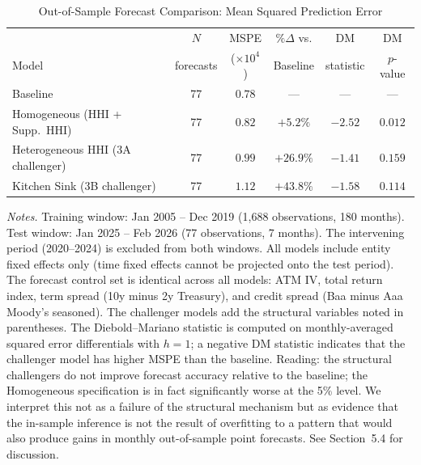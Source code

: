 
\begin{table}[!htbp]
\centering
\small
\caption{Out-of-Sample Forecast Comparison: Mean Squared Prediction Error}
\label{tab:oos_results}

\begin{threeparttable}
\begin{tabular}{l c c c c c}
\toprule
 & \multicolumn{1}{c}{$N$} & \multicolumn{1}{c}{MSPE}
   & \multicolumn{1}{c}{$\%\Delta$ vs.}
   & \multicolumn{1}{c}{DM}
   & \multicolumn{1}{c}{DM} \\
Model
   & \multicolumn{1}{c}{forecasts}
   & \multicolumn{1}{c}{($\times 10^{4}$)}
   & \multicolumn{1}{c}{Baseline}
   & \multicolumn{1}{c}{statistic}
   & \multicolumn{1}{c}{$p$-value} \\
\midrule
Baseline                            & 77 & $0.78$ & ---       & ---     & ---     \\
\addlinespace[2pt]
Homogeneous (HHI + Supp.\ HHI)      & 77 & $0.82$ & $+5.2\%$  & $-2.52$ & $0.012$ \\
Heterogeneous HHI (3A challenger)   & 77 & $0.99$ & $+26.9\%$ & $-1.41$ & $0.159$ \\
Kitchen Sink (3B challenger)        & 77 & $1.12$ & $+43.8\%$ & $-1.58$ & $0.114$ \\
\bottomrule
\end{tabular}

\begin{tablenotes}[flushleft]
\footnotesize
\item \textit{Notes.} Training window: Jan 2005 -- Dec 2019 (1{,}688 observations,
180 months). Test window: Jan 2025 -- Feb 2026 (77 observations, 7 months). The
intervening period (2020--2024) is excluded from both windows. All models include
entity fixed effects only (time fixed effects cannot be projected onto the test
period). The forecast control set is identical across all models: ATM IV, total
return index, term spread (10y minus 2y Treasury), and credit spread (Baa minus
Aaa Moody's seasoned). The challenger models add the structural variables noted
in parentheses. The Diebold--Mariano statistic is computed on monthly-averaged
squared error differentials with $h=1$; a negative DM statistic indicates that
the challenger model has higher MSPE than the baseline. Reading: the structural
challengers do not improve forecast accuracy relative to the baseline; the
Homogeneous specification is in fact significantly worse at the 5\% level. We
interpret this not as a failure of the structural mechanism but as evidence
that the in-sample inference is not the result of overfitting to a pattern
that would also produce gains in monthly out-of-sample point forecasts. See
Section~5.4 for discussion.
\end{tablenotes}
\end{threeparttable}

\end{table}

